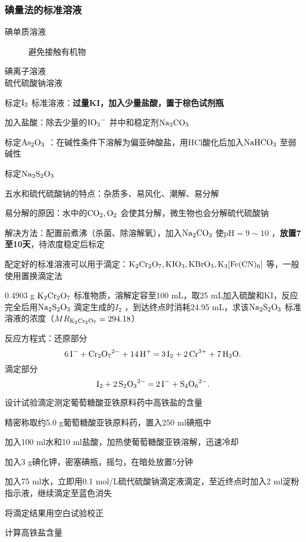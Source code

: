 \subsubsection*{碘量法的标准溶液}%
\label{subsub:碘量法的标准溶液}
\begin{description}
    \item[碘单质溶液] 避免接触有机物
    \item [碘离子溶液] 
    \item [硫代硫酸钠溶液]
\end{description}
\begin{notation}
标定$\ce{I_2}$ 标准溶液：\textbf{过量KI，加入少量盐酸，置于棕色试剂瓶}

加入盐酸：除去少量的$\ce{IO_3-}$ 并中和稳定剂$\ce{Na_2CO_3}$
\end{notation}
\begin{notation}
    标定$\ce{As_2O_3}$ ：在碱性条件下溶解为偏亚砷酸盐，用HCl酸化后加入$\ce{NaHCO3}$ 至弱碱性
\end{notation}
\begin{notation}
    标定$\ce{Na_2S_2O_3}$ 

    五水和硫代硫酸钠的特点：杂质多、易风化、潮解、易分解

    易分解的原因：水中的$\ce{CO_2, O_2}$ 会使其分解，微生物也会分解硫代硫酸钠

    解决方法：配置前煮沸（杀菌、除溶解氧），加入$\ce{Na_2CO_3}$ 使$\text{pH}=9\sim 10$ ，\textbf{放置7至10天}，待浓度稳定后标定

    配定好的标准溶液可以用于滴定：$\ce{K_2Cr_2O_7, KIO_3, KBrO_3, K_3[Fe(CN)_6]}$ 等，一般使用置换滴定法
\end{notation}
\begin{eg}
    0.4903 g $\ce{K_2Cr_2O_7}$ 标准物质，溶解定容至100 mL，取25 mL加入硫酸和KI，反应完全后用$\ce{Na_2S_2O_3}$ 滴定生成的$I_2$ ，到达终点时消耗24.95 mL，求该$\ce{Na_2S_2O_3}$ 标准溶液的浓度（$MR_{\ce{K_2Cr_2O_7}}=294.18$）
\end{eg}
\begin{notation}
    反应方程式：还原部分\[
        \ce{6I^- + Cr_2O_7^{2-} + 14H^+ = 3I_2 + 2Cr^{3+} + 7H_2O}
    .\]
    滴定部分\[
        \ce{I_2 + 2S_2O_3^{2-} = 2I^- + S_4O_6^{2-}}
    .\]
\end{notation}
\begin{eg}
    设计试验滴定测定葡萄糖酸亚铁原料药中高铁盐的含量
\end{eg}
\begin{sol}
    精密称取约5.0 g葡萄糖酸亚铁原料药，置入250 ml碘瓶中

    加入100 ml水和10 ml盐酸，加热使葡萄糖酸亚铁溶解，迅速冷却

    加入3 g碘化钾，密塞碘瓶，摇匀，在暗处放置5分钟

    加入75 ml水，立即用0.1 mol/L硫代硫酸钠滴定液滴定，至近终点时加入2 ml淀粉指示液，继续滴定至蓝色消失

    将滴定结果用空白试验校正

    计算高铁盐含量
\end{sol}
